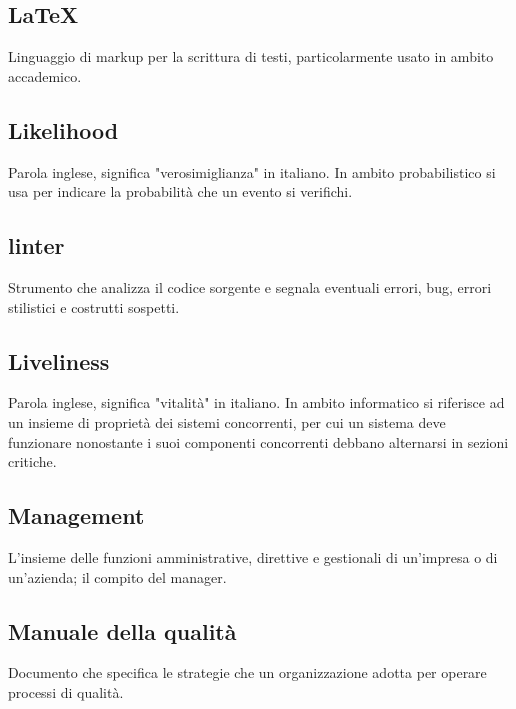 	\newpage


	\subsection{LaTeX}
	\label{sec:latex}
	Linguaggio di markup per la scrittura di testi, particolarmente usato in ambito accademico.



	\subsection{Likelihood}
	\label{sec:likelihood}
	Parola inglese, significa "verosimiglianza" in italiano. In ambito probabilistico si usa per indicare la probabilità che un evento si verifichi.
	\subsection{linter}
	\label{sec:linter}
	Strumento che analizza il codice sorgente e segnala eventuali errori, bug, errori stilistici e costrutti sospetti.


	\subsection{Liveliness}
	\label{sec:liveliness}
	Parola inglese, significa "vitalità" in italiano. In ambito informatico si riferisce ad un insieme di proprietà dei sistemi concorrenti, per cui un sistema deve funzionare nonostante i suoi componenti concorrenti debbano alternarsi in sezioni critiche.


	\newpage


	\subsection{Management}
	\label{sec:management}
	L'insieme delle funzioni amministrative, direttive e gestionali di un'impresa o di un'azienda; il compito del manager.


	\subsection{Manuale della qualità}
	\label{sec:manualequalita}
	Documento che specifica le strategie che un organizzazione adotta per operare processi di qualità.


